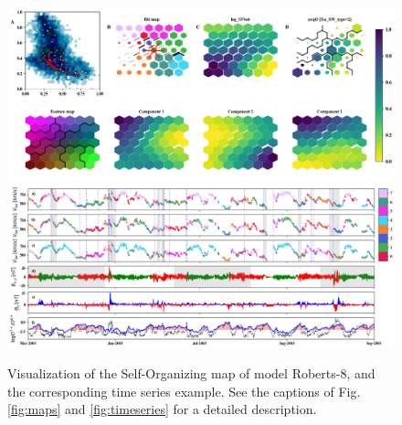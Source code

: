 \documentclass[utf8]{frontiersSCNS} %
\begin{document}
\begin{figure}[h!]
	\begin{center}
		\includegraphics[width=16cm]{Roberts/maps}\\%
			\includegraphics[width=18cm]{Roberts/timeseries}
	\end{center}
	\caption{Visualization of the Self-Organizing map of model Roberts-8, and the corresponding time series example. See the captions of Fig.\ref{fig:maps}  and \ref{fig:timeseries} for a detailed description.}\label{fig:modelR}
\end{figure}
\end{document}
